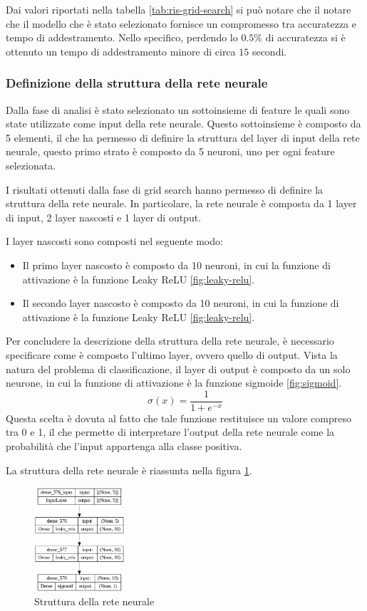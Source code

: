 Dai valori riportati nella tabella \ref{tab:ris-grid-search} si può notare che il
notare che il modello che è stato selezionato fornisce un compromesso tra
accuratezza e tempo di addestramento. Nello specifico, perdendo lo $0.5\%$ di
accuratezza si è ottenuto un tempo di addestramento minore di circa $15$ secondi.
\subsubsection{Definizione della struttura della rete neurale}
Dalla fase di analisi è stato selezionato un sottoinsieme di feature le quali
sono state utilizzate come input della rete neurale. Questo sottoinsieme è
composto da 5 elementi, il che ha permesso di definire la struttura del layer di
input della rete neurale, questo primo strato è composto da 5 neuroni, uno per
ogni feature selezionata.

I risultati ottenuti dalla fase di grid search hanno permesso di definire la
struttura della rete neurale. In particolare, la rete neurale è composta da 1
layer di input, 2 layer nascosti e 1 layer di output.

I layer nascosti sono composti nel seguente modo:
\begin{itemize}
    \item Il primo layer nascosto è composto da 10 neuroni, in cui la funzione di
          attivazione è la funzione Leaky ReLU \ref{fig:leaky-relu}.
    \item Il secondo layer nascosto è composto da 10 neuroni, in cui la funzione
          di attivazione è la funzione Leaky ReLU \ref{fig:leaky-relu}.
\end{itemize}

Per concludere la descrizione della struttura della rete neurale, è necessario
specificare come è composto l'ultimo layer, ovvero quello di output. Vista la
natura del problema di classificazione, il layer di output è composto da un solo
neurone, in cui la funzione di attivazione è la funzione sigmoide \ref{fig:sigmoid}.
\begin{equation}
    \sigma(x) = \frac{1}{1 + e^{-x}}
\end{equation}
Questa scelta è dovuta al fatto che tale funzione restituisce un valore compreso
tra 0 e 1, il che permette di interpretare l'output della rete neurale come la
probabilità che l'input appartenga alla classe positiva.

La struttura della rete neurale è riassunta nella figura \ref{fig:strutturaReteNeurale}.
\begin{figure}[!ht]
    \centering
    \includegraphics[width=0.3\textwidth]{img/rete/struttura_rete.png}
    \caption{Struttura della rete neurale}
    \label{fig:strutturaReteNeurale}
\end{figure}
